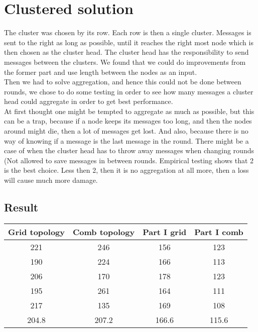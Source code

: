 \documentclass{article}
\begin{document}
  \section{Clustered solution}
   The cluster was chosen by its row. Each row is then a single cluster. Messages
   is sent to the right as long as possible, until it reaches the right most
   node which is then chosen as the cluster head. The cluster head has the
   responsibility to send messages between the clusters. We found that
   we could do improvements from the former part and use length between the
   nodes as an input.\\
   Then we had to solve aggregation, and hence this could not be done between
   rounds, we chose to do some testing in order to see how many messages a cluster
   head could aggregate in order to get best performance.\\
   At first thought one might be tempted to aggregate as much as possible, but
   this can be a trap, because if a node keeps its messages too long, and then
   the nodes around might die, then a lot of messages get lost. And also, because
   there is no way of knowing if a message is the last message in the round. There might be
   a case of when the cluster head has to throw away messages when changing
   rounds (Not allowed to save messages in between rounds. Empirical testing
   shows that 2 is the best choice. Less then 2, then it is no aggregation at all
   more, then a loss will cause much more damage. 

  \subsection{Result}
    \begin{tabular}{c|c||c|c}
      Grid topology & Comb topology & Part I grid & Part I comb\\
      \hline
      \hline
      221 &246  &156 & 123 \\
      190 &224  &166 & 113 \\
      206 &170  &178 & 123 \\
      195 &261  &164 & 111 \\
      217 &135  &169 & 108 \\
      \hline
      204.8&207.2&166.6&115.6\\
    \end{tabular}
\end{document}
